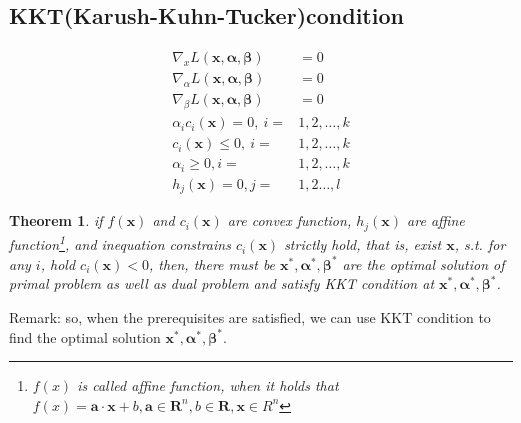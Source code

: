 \documentclass[UTF8]{ctexart}
\newtheorem{theorem}{Theorem}
\begin{document}
	\subsection{KKT(Karush-Kuhn-Tucker)condition}
		\begin{equation*}
		\begin{split}
		\nabla_{x}L(\bm x,\bm\alpha,\bm\beta)&=0\\
		\nabla_{\alpha}L(\bm x,\bm\alpha,\bm\beta)&=0\\
		\nabla_{\beta}L(\bm x,\bm\alpha,\bm\beta)&=0\\
		\alpha_{i}c_{i}(\bm x)=0, \ i=&1,2,\dots,k\\
		c_{i}(\bm x)\leq0, \ i=&1,2,\dots,k\\
		\alpha_{i}\geq0, i=&1,2,\dots,k\\
		h_{j}(\bm x)=0, j=&1,2\dots,l
		\end{split}
		\end{equation*}

		\begin{theorem}
		if $f(\bm x)$ and $c_{i}(\bm x)$ are convex function, $h_{j}(\bm x)$ are affine function\footnote{$f(x)$ is called affine function, when it holds that $f(x)=\bm a\cdot \bm x+b, \bm a\in \bm{R}^{n},b\in \bm R, \bm x\in R^{n}$}, and inequation constrains $c_{i}(\bm x)$ strictly hold, that is, exist $\bm x$, s.t. for any $i$, hold $c_{i}(\bm x)<0$, then, there must be $\bm x^{*},\bm\alpha^{*},\bm\beta^{*}$ are the optimal solution of primal problem as well as dual problem and satisfy KKT condition at $\bm x^{*},\bm\alpha^{*},\bm\beta^{*}$.
		\end{theorem}
		Remark: so, when the prerequisites are satisfied, we can use KKT condition to find the optimal solution $\bm x^{*},\bm\alpha^{*},\bm\beta^{*}$.
\end{document}
